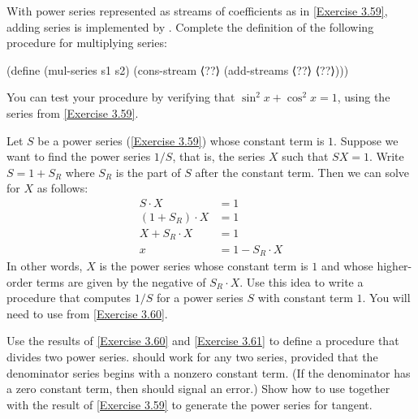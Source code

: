 \begin{exercise}
	\label{Exercise 3.60}
	With power series represented as streams of coefficients as in \cref{Exercise 3.59}, adding series is implemented by .
	Complete the definition of the following procedure for multiplying series:
	\begin{scheme}
	  (define (mul-series s1 s2)
	    (cons-stream ⟨??⟩ (add-streams ⟨??⟩ ⟨??⟩)))
	\end{scheme}
	You can test your procedure by verifying that \( \sin^2 x + \cos^2 x = 1 \), using the series from \cref{Exercise 3.59}.
\end{exercise}



\begin{exercise}
	\label{Exercise 3.61}
	Let \( S \) be a power series (\cref{Exercise 3.59}) whose constant term is \( 1 \).
	Suppose we want to find the power series \( 1 / S \), that is, the series \( X \) such that \( S X = 1 \).
	Write \( S = 1 + S_R \) where \( S_R \) is the part of \( S \) after the constant term.
	Then we can solve for \( X \) as follows:
	\begin{align*}
		        S ⋅ X &= 1 \\
		(1 + S_R) ⋅ X &= 1 \\
		  X + S_R ⋅ X &= 1 \\
		            x &= 1 - S_R ⋅ X
	\end{align*}
	In other words, \( X \) is the power series whose constant term is \( 1 \) and whose higher-order terms are given by the negative of \( S_R ⋅ X \).
	Use this idea to write a procedure  that computes \( 1 / S \) for a power series \( S \) with constant term \( 1 \).
	You will need to use  from \cref{Exercise 3.60}.
\end{exercise}



\begin{exercise}
	\label{Exercise 3.62}
	Use the results of \cref{Exercise 3.60} and \cref{Exercise 3.61} to define a procedure  that divides two power series.
	 should work for any two series, provided that the denominator series begins with a nonzero constant term.
	(If the denominator has a zero constant term, then  should signal an error.)
	Show how to use  together with the result of \cref{Exercise 3.59} to generate the power series for tangent.
\end{exercise}

